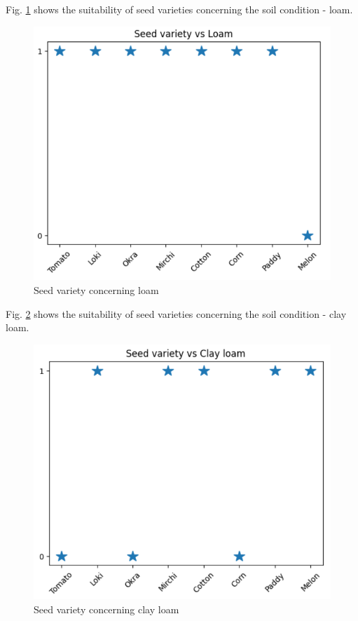 \documentclass[conference]{IEEEtran}
\begin{document}
Fig. \ref{df} shows the suitability of seed varieties concerning the soil condition - loam.
\begin{figure}[htp]
    \centering
    \includegraphics[scale=0.5]{plot13.png}
    \caption{Seed variety concerning loam}
    \label{df}
\end{figure}
Fig. \ref{dt} shows the suitability of seed varieties concerning the soil condition - clay loam.
\begin{figure}[htp]
    \centering
    \includegraphics[scale=0.5]{plot14.png}
    \caption{Seed variety concerning clay loam}
    \label{dt}
\end{figure}
\end{document}
